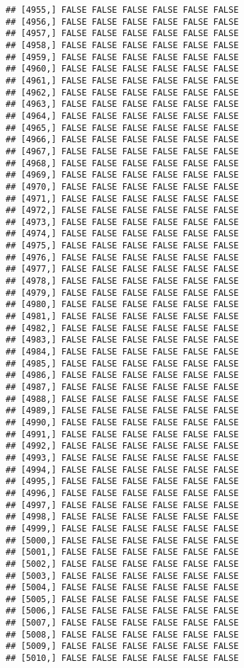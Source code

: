 \documentclass[
]{article}
\begin{document}
\begin{verbatim}
## [4955,] FALSE FALSE FALSE FALSE FALSE FALSE
## [4956,] FALSE FALSE FALSE FALSE FALSE FALSE
## [4957,] FALSE FALSE FALSE FALSE FALSE FALSE
## [4958,] FALSE FALSE FALSE FALSE FALSE FALSE
## [4959,] FALSE FALSE FALSE FALSE FALSE FALSE
## [4960,] FALSE FALSE FALSE FALSE FALSE FALSE
## [4961,] FALSE FALSE FALSE FALSE FALSE FALSE
## [4962,] FALSE FALSE FALSE FALSE FALSE FALSE
## [4963,] FALSE FALSE FALSE FALSE FALSE FALSE
## [4964,] FALSE FALSE FALSE FALSE FALSE FALSE
## [4965,] FALSE FALSE FALSE FALSE FALSE FALSE
## [4966,] FALSE FALSE FALSE FALSE FALSE FALSE
## [4967,] FALSE FALSE FALSE FALSE FALSE FALSE
## [4968,] FALSE FALSE FALSE FALSE FALSE FALSE
## [4969,] FALSE FALSE FALSE FALSE FALSE FALSE
## [4970,] FALSE FALSE FALSE FALSE FALSE FALSE
## [4971,] FALSE FALSE FALSE FALSE FALSE FALSE
## [4972,] FALSE FALSE FALSE FALSE FALSE FALSE
## [4973,] FALSE FALSE FALSE FALSE FALSE FALSE
## [4974,] FALSE FALSE FALSE FALSE FALSE FALSE
## [4975,] FALSE FALSE FALSE FALSE FALSE FALSE
## [4976,] FALSE FALSE FALSE FALSE FALSE FALSE
## [4977,] FALSE FALSE FALSE FALSE FALSE FALSE
## [4978,] FALSE FALSE FALSE FALSE FALSE FALSE
## [4979,] FALSE FALSE FALSE FALSE FALSE FALSE
## [4980,] FALSE FALSE FALSE FALSE FALSE FALSE
## [4981,] FALSE FALSE FALSE FALSE FALSE FALSE
## [4982,] FALSE FALSE FALSE FALSE FALSE FALSE
## [4983,] FALSE FALSE FALSE FALSE FALSE FALSE
## [4984,] FALSE FALSE FALSE FALSE FALSE FALSE
## [4985,] FALSE FALSE FALSE FALSE FALSE FALSE
## [4986,] FALSE FALSE FALSE FALSE FALSE FALSE
## [4987,] FALSE FALSE FALSE FALSE FALSE FALSE
## [4988,] FALSE FALSE FALSE FALSE FALSE FALSE
## [4989,] FALSE FALSE FALSE FALSE FALSE FALSE
## [4990,] FALSE FALSE FALSE FALSE FALSE FALSE
## [4991,] FALSE FALSE FALSE FALSE FALSE FALSE
## [4992,] FALSE FALSE FALSE FALSE FALSE FALSE
## [4993,] FALSE FALSE FALSE FALSE FALSE FALSE
## [4994,] FALSE FALSE FALSE FALSE FALSE FALSE
## [4995,] FALSE FALSE FALSE FALSE FALSE FALSE
## [4996,] FALSE FALSE FALSE FALSE FALSE FALSE
## [4997,] FALSE FALSE FALSE FALSE FALSE FALSE
## [4998,] FALSE FALSE FALSE FALSE FALSE FALSE
## [4999,] FALSE FALSE FALSE FALSE FALSE FALSE
## [5000,] FALSE FALSE FALSE FALSE FALSE FALSE
## [5001,] FALSE FALSE FALSE FALSE FALSE FALSE
## [5002,] FALSE FALSE FALSE FALSE FALSE FALSE
## [5003,] FALSE FALSE FALSE FALSE FALSE FALSE
## [5004,] FALSE FALSE FALSE FALSE FALSE FALSE
## [5005,] FALSE FALSE FALSE FALSE FALSE FALSE
## [5006,] FALSE FALSE FALSE FALSE FALSE FALSE
## [5007,] FALSE FALSE FALSE FALSE FALSE FALSE
## [5008,] FALSE FALSE FALSE FALSE FALSE FALSE
## [5009,] FALSE FALSE FALSE FALSE FALSE FALSE
## [5010,] FALSE FALSE FALSE FALSE FALSE FALSE

\end{verbatim}
\end{document}
